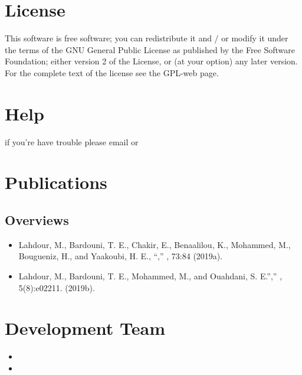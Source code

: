 \documentclass[letterpaper,10pt,english]{sphinxmanual}
\begin{document}
\chapter{License}
\label{\detokenize{License:license}}\label{\detokenize{License::doc}}
This software is free software; you can redistribute it and / or modify it under the terms of the GNU General Public License as published by the Free Software Foundation; either version 2 of the License, or (at your option) any later version. For the complete text of the license see the GPL-web page.


\chapter{Help}
\label{\detokenize{Help:help}}\label{\detokenize{Help::doc}}
if you’re have trouble please email  or 


\chapter{Publications}
\label{\detokenize{Publications:publications}}\label{\detokenize{Publications::doc}}

\section{Overviews}
\label{\detokenize{Publications:overviews}}\begin{itemize}
\item {} 
Lahdour, M., Bardouni, T. E., Chakir, E., Benaalilou, K., Mohammed, M., Bougueniz, H.,
and Yaakoubi, H. E., “,”
, 73:84 \textendash{}  (2019a).

\item {} 
Lahdour, M., Bardouni, T. E., Mohammed, M., and Ouahdani, S. E.”,”
, 5(8):e02211.  (2019b).

\end{itemize}


\chapter{Development Team}
\label{\detokenize{developers:development-team}}\label{\detokenize{developers::doc}}\begin{itemize}
\item {} 

\item {} 

\end{itemize}
\end{document}
